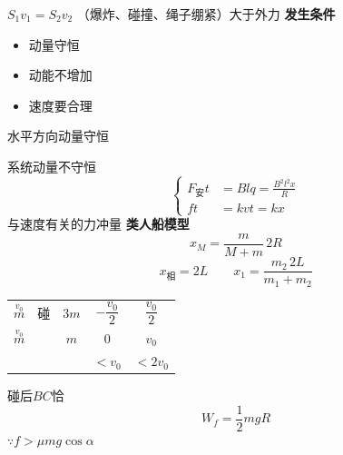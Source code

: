 $S_1v_1=S_2v_2$
（爆炸、碰撞、绳子绷紧）大于外力
\textbf{发生条件}
\begin{itemize}
\item 动量守恒
\item 动能不增加
\item 速度要合理
\end{itemize}
水平方向动量守恒

系统动量不守恒
\[
\left\{
\begin{aligned}
F_{\text{安}}t&=Blq=\frac{B^2l^2x}{R}\\
ft&=kvt=kx
\end{aligned}
\right.
\]
与速度有关的力冲量
\textbf{类人船模型}
\[
x_M=\frac{m}{M+m}\,2R
\]
\[
x_{\text{相}}=2L\qquad x_1=\frac{m_2\,2L}{m_1+m_2}
\]
\begin{center}
\begin{tabular}{ccccc}
$\overset{v_0}{m}$ & 碰 & $3m$ & $-\dfrac{v_0}{2}$ & $\dfrac{v_0}{2}$\\[6pt]
$\overset{v_0}{m}$ & & $m$ & $0$ & $v_0$\\[6pt]
 & & & $<v_0$ & $<2v_0$
\end{tabular}
\end{center}
碰后$BC$恰
\[
W_f=\frac{1}{2}mgR
\]
$\because f>\mu mg\cos\alpha$

